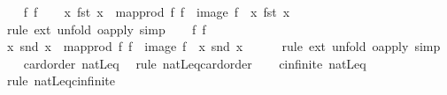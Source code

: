 \begin{isabellebody}
\isamarkupfalse%
\isanewline
\ \ \isamarkupfalse%
\ f{}\ f{}\isanewline
\ \ \isamarkupfalse%
\ {\isachardoublequoteopen}{\isacharparenleft}{\kern0pt}{\isasymlambda}x{\isachardot}{\kern0pt}\ {\isacharbraceleft}{\kern0pt}fst\ x{\isacharbraceright}{\kern0pt}{\isacharparenright}{\kern0pt}\ {\isasymcirc}\ map{\isacharunderscore}{\kern0pt}prod\ f{}\ f{}\ {\isacharequal}{\kern0pt}\ image\ f{}\ {\isasymcirc}\ {\isacharparenleft}{\kern0pt}{\isasymlambda}x{\isachardot}{\kern0pt}\ {\isacharbraceleft}{\kern0pt}fst\ x{\isacharbraceright}{\kern0pt}{\isacharparenright}{\kern0pt}{\isachardoublequoteclose}\isanewline
\ \ \ \ \isamarkupfalse%
\ {\isacharparenleft}{\kern0pt}rule\ ext{\isacharcomma}{\kern0pt}\ unfold\ o{\isacharunderscore}{\kern0pt}apply{\isacharparenright}{\kern0pt}\ simp\isanewline
{}\isamarkupfalse%
\isanewline
\ \ \isamarkupfalse%
\ f{}\ f{}\isanewline
\ \ \isamarkupfalse%
\ {\isachardoublequoteopen}{\isacharparenleft}{\kern0pt}{\isasymlambda}x{\isachardot}{\kern0pt}\ {\isacharbraceleft}{\kern0pt}snd\ x{\isacharbraceright}{\kern0pt}{\isacharparenright}{\kern0pt}\ {\isasymcirc}\ map{\isacharunderscore}{\kern0pt}prod\ f{}\ f{}\ {\isacharequal}{\kern0pt}\ image\ f{}\ {\isasymcirc}\ {\isacharparenleft}{\kern0pt}{\isasymlambda}x{\isachardot}{\kern0pt}\ {\isacharbraceleft}{\kern0pt}snd\ x{\isacharbraceright}{\kern0pt}{\isacharparenright}{\kern0pt}{\isachardoublequoteclose}\isanewline
\ \ \ \ \isamarkupfalse%
\ {\isacharparenleft}{\kern0pt}rule\ ext{\isacharcomma}{\kern0pt}\ unfold\ o{\isacharunderscore}{\kern0pt}apply{\isacharparenright}{\kern0pt}\ simp\isanewline
{}\isamarkupfalse%
\isanewline
\ \ \isamarkupfalse%
\ {\isachardoublequoteopen}card{\isacharunderscore}{\kern0pt}order\ natLeq{\isachardoublequoteclose}\ \isamarkupfalse%
\ {\isacharparenleft}{\kern0pt}rule\ natLeq{\isacharunderscore}{\kern0pt}card{\isacharunderscore}{\kern0pt}order{\isacharparenright}{\kern0pt}\isanewline
{}\isamarkupfalse%
\isanewline
\ \ \isamarkupfalse%
\ {\isachardoublequoteopen}cinfinite\ natLeq{\isachardoublequoteclose}\ \isamarkupfalse%
\ {\isacharparenleft}{\kern0pt}rule\ natLeq{\isacharunderscore}{\kern0pt}cinfinite{\isacharparenright}{\kern0pt}\isanewline
{}\isamarkupfalse%
\isanewline
\ \ \isamarkupfalse%

\end{isabellebody}
